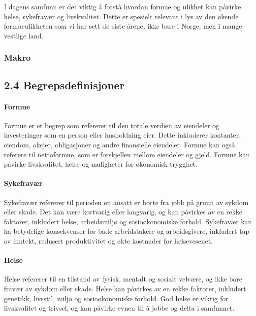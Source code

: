 \documentclass[
  12pt,
  a4paper,
  DIV=11,
  numbers=noendperiod]{scrartcl}
\let\oldparagraph\paragraph
\renewcommand{\paragraph}[1]{\oldparagraph{#1}\mbox{}}
\begin{document}
I dagens samfunn er det viktig å forstå hvordan formue og ulikhet kan
påvirke helse, sykefravær og livskvalitet. Dette er spesielt relevant i
lys av den økende formueulikheten som vi har sett de siste årene, ikke
bare i Norge, men i mange vestlige land.

\subsubsection{Makro}\label{makro}

\subsection{2.4 Begrepsdefinisjoner}\label{begrepsdefinisjoner}

\paragraph{Formue}\label{formue}

Formue er et begrep som refererer til den totale verdien av eiendeler og
investeringer som en person eller husholdning eier. Dette inkluderer
kontanter, eiendom, aksjer, obligasjoner og andre finansielle eiendeler.
Formue kan også referere til nettoformue, som er forskjellen mellom
eiendeler og gjeld. Formue kan påvirke livskvalitet, helse og muligheter
for økonomisk trygghet.

\paragraph{Sykefravær}\label{sykefravuxe6r}

Sykefravær refererer til perioden en ansatt er borte fra jobb på grunn
av sykdom eller skade. Det kan være kortvarig eller langvarig, og kan
påvirkes av en rekke faktorer, inkludert helse, arbeidsmiljø og
sosioøkonomiske forhold. Sykefravær kan ha betydelige konsekvenser for
både arbeidstakere og arbeidsgivere, inkludert tap av inntekt, redusert
produktivitet og økte kostnader for helsevesenet.

\paragraph{Helse}\label{helse}

Helse refererer til en tilstand av fysisk, mentalt og sosialt velvære,
og ikke bare fravær av sykdom eller skade. Helse kan påvirkes av en
rekke faktorer, inkludert genetikk, livsstil, miljø og sosioøkonomiske
forhold. God helse er viktig for livskvalitet og trivsel, og kan påvirke
evnen til å jobbe og delta i samfunnet.
\end{document}
